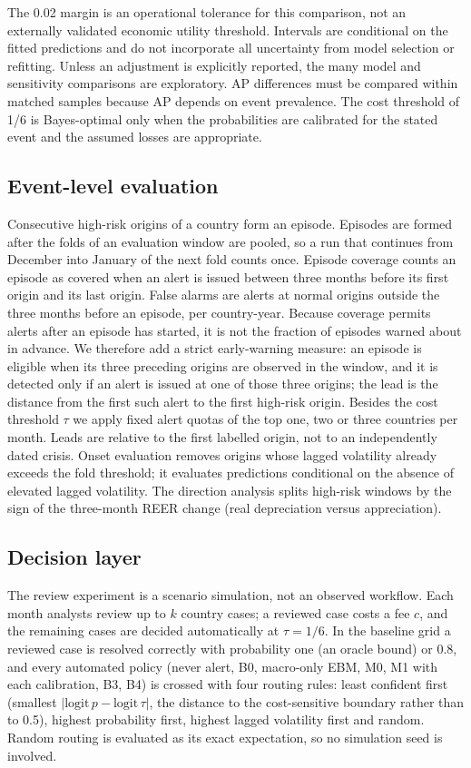 \documentclass[preprint,12pt,authoryear]{elsarticle}
\begin{document}
The 0.02 margin is an operational tolerance for this comparison, not an externally validated economic utility threshold. Intervals are conditional on the fitted predictions and do not incorporate all uncertainty from model selection or refitting. Unless an adjustment is explicitly reported, the many model and sensitivity comparisons are exploratory. AP differences must be compared within matched samples because AP depends on event prevalence. The cost threshold of 1/6 is Bayes-optimal only when the probabilities are calibrated for the stated event and the assumed losses are appropriate.

\subsection{Event-level evaluation}
Consecutive high-risk origins of a country form an episode. Episodes are formed after the folds of an evaluation window are pooled, so a run that continues from December into January of the next fold counts once. Episode coverage counts an episode as covered when an alert is issued between three months before its first origin and its last origin. False alarms are alerts at normal origins outside the three months before an episode, per country-year. Because coverage permits alerts after an episode has started, it is not the fraction of episodes warned about in advance. We therefore add a strict early-warning measure: an episode is eligible when its three preceding origins are observed in the window, and it is detected only if an alert is issued at one of those three origins; the lead is the distance from the first such alert to the first high-risk origin. Besides the cost threshold $\tau$ we apply fixed alert quotas of the top one, two or three countries per month. Leads are relative to the first labelled origin, not to an independently dated crisis. Onset evaluation removes origins whose lagged volatility already exceeds the fold threshold; it evaluates predictions conditional on the absence of elevated lagged volatility. The direction analysis splits high-risk windows by the sign of the three-month REER change (real depreciation versus appreciation).

\subsection{Decision layer}
The review experiment is a scenario simulation, not an observed workflow. Each month analysts review up to $k$ country cases; a reviewed case costs a fee $c$, and the remaining cases are decided automatically at $\tau = 1/6$. In the baseline grid a reviewed case is resolved correctly with probability one (an oracle bound) or 0.8, and every automated policy (never alert, B0, macro-only EBM, M0, M1 with each calibration, B3, B4) is crossed with four routing rules: least confident first (smallest $|\mathrm{logit}\,p - \mathrm{logit}\,\tau|$, the distance to the cost-sensitive boundary rather than to 0.5), highest probability first, highest lagged volatility first and random. Random routing is evaluated as its exact expectation, so no simulation seed is involved.
\end{document}
